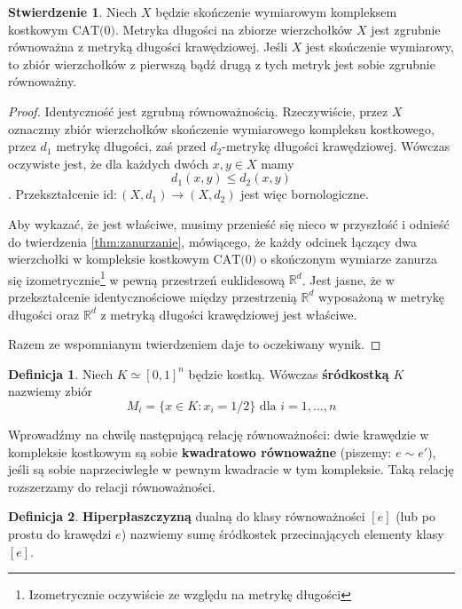 \documentclass[licencjacka]{pracamgr}
\theoremstyle{definition}
\newtheorem{definition}{Definicja}[section]
\theoremstyle{definition}
\theoremstyle{definition}
\newtheorem{proposition}{Stwierdzenie}[section]
\theoremstyle{definition}
\theoremstyle{definition}
\theoremstyle{plain}
\theoremstyle{plain}
\begin{document}
\begin{proposition}\label{pro:equivalent}
	Niech $ X $ będzie skończenie wymiarowym 
	kompleksem kostkowym $ \text{CAT(0)}$. Metryka długości na 
	zbiorze wierzchołków $ X $ jest zgrubnie równoważna z metryką długości krawędziowej.
	Jeśli $ X $ jest skończenie wymiarowy, to zbiór wierzchołków z pierwszą bądź drugą z 
	tych metryk jest sobie zgrubnie równoważny.
\end{proposition}
\begin{proof}
	Identyczność jest zgrubną równoważnością. Rzeczywiście, przez $ X $ oznaczmy 
	zbiór wierzchołków skończenie wymiarowego kompleksu kostkowego, przez 
	$ d_1 $ metrykę długości, zaś przed $ d_2 $-metrykę długości krawędziowej. 
	Wówczas oczywiste jest, że dla każdych dwóch $ x,y \in X $ mamy
	$$ d_1(x,y) \leq d_2(x,y) $$.	
	Przekształcenie $ \text{id}: (X,d_1) \rightarrow (X,d_2) $ jest więc bornologiczne.

	Aby wykazać, że jest właściwe, musimy przenieść się nieco w przyszłość i odnieść do 
	twierdzenia \ref{thm:zanurzanie}, mówiącego, że każdy odcinek łączący dwa wierzchołki 
	w kompleksie kostkowym $ \text{CAT(0)} $ o skończonym wymiarze zanurza się 
	izometrycznie\footnote{Izometrycznie oczywiście ze względu na metrykę długości} 
	w pewną przestrzeń euklidesową $ \mathbb{R}^d $. Jest jasne, że w przekształcenie 
	identycznościowe między przestrzenią $ \mathbb{R}^d $ wyposażoną w metrykę długości 
	oraz $ \mathbb{R}^d $ z metryką długości krawędziowej jest właściwe.

	Razem ze wspomnianym twierdzeniem daje to oczekiwany wynik.
\end{proof}

\begin{definition}
	Niech $ K \simeq [0,1]^n $ będzie kostką. Wówczas \textbf{śródkostką} $ K $ nazwiemy 
	zbiór
	$$ M_i = \{ x \in K : x_i = 1/2 \} \text{ dla } i = 1,\dots,n $$
\end{definition}
Wprowadźmy na chwilę następującą relację równoważności: dwie krawędzie w kompleksie 
kostkowym są sobie \textbf{kwadratowo równoważne} (piszemy: $ e \sim e' $), jeśli 
są sobie naprzeciwległe w pewnym kwadracie w tym kompleksie. Taką relację rozszerzamy do 
relacji równoważności.
\begin{definition}
	\textbf{Hiperpłaszczyzną} dualną do klasy równoważności $ [e] $ (lub po prostu do 
	krawędzi $ e $) nazwiemy sumę śródkostek przecinających elementy klasy $ [e] $.
\end{definition}
\end{document}
